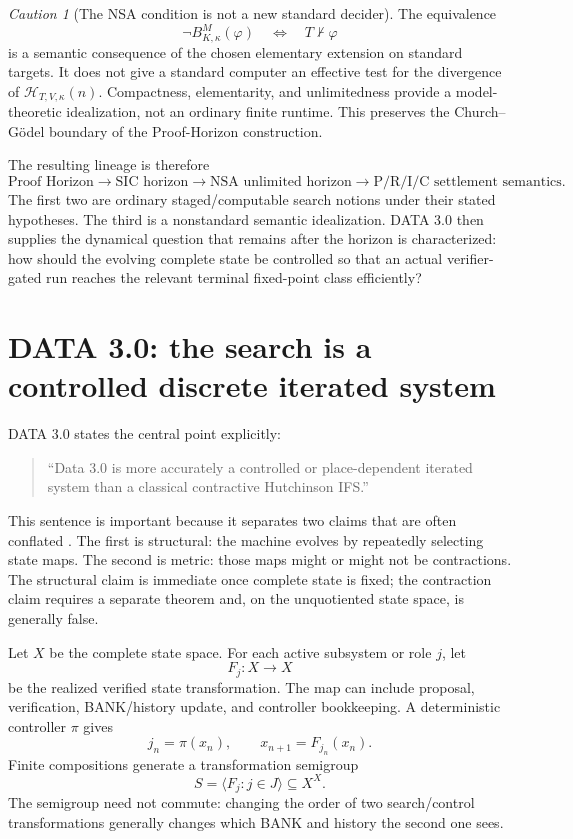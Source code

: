 \documentclass[11pt]{article}
\theoremstyle{definition}
\theoremstyle{remark}
\newtheorem{caution}[theorem]{Caution}
\begin{document}
\begin{caution}[The NSA condition is not a new standard decider]
The equivalence
\[
\neg B^M_{K,\kappa}(\varphi)
\quad\Longleftrightarrow\quad
T\nvdash\varphi
\]
is a semantic consequence of the chosen elementary extension on standard targets. It does not give a standard computer an effective test for the divergence of $\mathcal H_{T,V,\kappa}(n)$. Compactness, elementarity, and unlimitedness provide a model-theoretic idealization, not an ordinary finite runtime. This preserves the Church--G\"odel boundary of the Proof-Horizon construction.
\end{caution}

The resulting lineage is therefore
\[
\boxed{
\text{Proof Horizon}
\longrightarrow
\text{SIC horizon}
\longrightarrow
\text{NSA unlimited horizon}
\longrightarrow
\text{P/R/I/C settlement semantics}.
}
\]
The first two are ordinary staged/computable search notions under their stated hypotheses. The third is a nonstandard semantic idealization. DATA 3.0 then supplies the dynamical question that remains after the horizon is characterized: how should the evolving complete state be controlled so that an actual verifier-gated run reaches the relevant terminal fixed-point class efficiently?

\section{DATA 3.0: the search is a controlled discrete iterated system}

DATA 3.0 states the central point explicitly:
\begin{quote}
``Data 3.0 is more accurately a controlled or place-dependent iterated system than a classical contractive Hutchinson IFS.''
\end{quote}
This sentence is important because it separates two claims that are often conflated \cite{Data3}. The first is structural: the machine evolves by repeatedly selecting state maps. The second is metric: those maps might or might not be contractions. The structural claim is immediate once complete state is fixed; the contraction claim requires a separate theorem and, on the unquotiented state space, is generally false.

Let $X$ be the complete state space. For each active subsystem or role $j$, let
\[
F_j:X\to X
\]
be the realized verified state transformation. The map can include proposal, verification, BANK/history update, and controller bookkeeping. A deterministic controller $\pi$ gives
\[
j_n=\pi(x_n),
\qquad
x_{n+1}=F_{j_n}(x_n).
\]
Finite compositions generate a transformation semigroup
\[
S=\langle F_j:j\in J\rangle\subseteq X^X.
\]
The semigroup need not commute: changing the order of two search/control transformations generally changes which BANK and history the second one sees.
\end{document}
